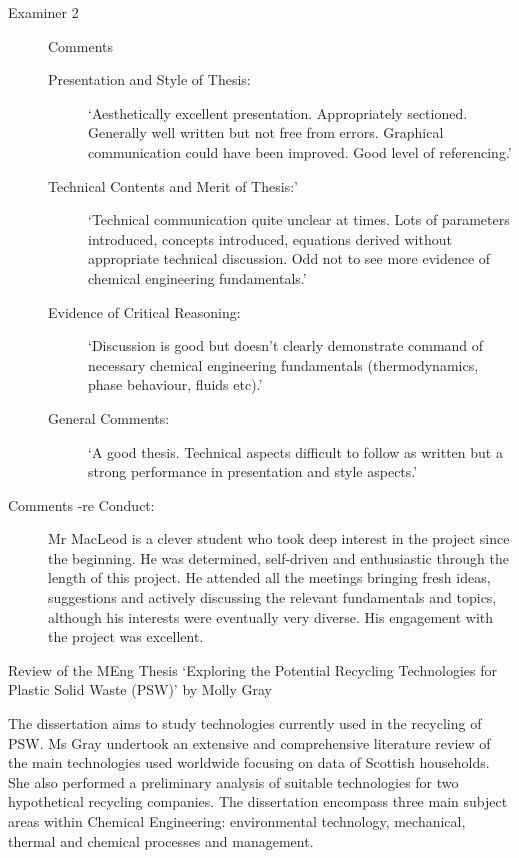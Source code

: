 \documentclass[14pt,twoside]{report}
\begin{document}
\begin{description}
\item[Examiner 2] Comments
   \begin{description}
      \item[Presentation and Style of Thesis:] `Aesthetically excellent presentation. Appropriately sectioned. Generally well written but not free from errors. Graphical communication could have been improved. Good level of referencing.'
      \item[Technical Contents and Merit of Thesis:'] `Technical communication quite unclear at times. Lots of parameters introduced, concepts introduced, equations derived without appropriate technical discussion. Odd not to see more evidence of chemical engineering fundamentals.'
      \item[Evidence of Critical Reasoning:] `Discussion is good but doesn't clearly demonstrate command of necessary chemical engineering fundamentals (thermodynamics, phase behaviour, fluids etc).'
      \item[General Comments:] `A good thesis. Technical aspects difficult to follow as written but a strong performance in presentation and style aspects.'
   \end{description}
%
 \item[Comments -re Conduct:] Mr MacLeod is a clever student who took deep interest in the project since the beginning. He was determined, self-driven and enthusiastic through the length of this project. He attended all the meetings bringing fresh ideas, suggestions and actively discussing the relevant fundamentals and topics, although his interests were eventually very diverse. His engagement with the project was excellent. 

\end{description}
\clearpage



\bigskip 

\begin{center}
  {\Large Review of the MEng Thesis `Exploring the Potential Recycling Technologies for Plastic Solid Waste (PSW)' by Molly Gray}
\end{center}
The dissertation aims to study technologies currently used in the recycling of PSW. Ms Gray undertook an extensive and comprehensive literature review of the main technologies used worldwide focusing on data of Scottish households. She also performed a preliminary analysis of suitable technologies for two hypothetical recycling companies. The dissertation encompass three main subject areas within Chemical Engineering: environmental technology, mechanical, thermal and chemical processes and management.
\end{document}
